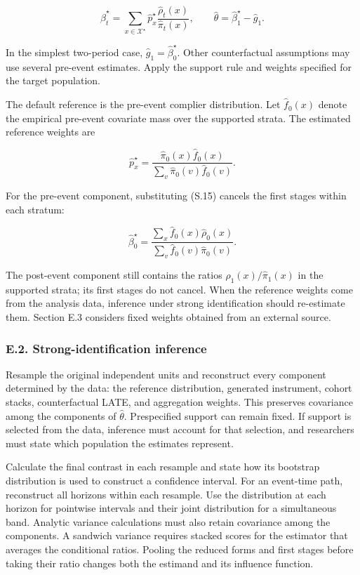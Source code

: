 \documentclass[
  11pt,
]{article}
\begin{document}
\[
\widehat\beta_t^\star
=\sum_{x\in\mathcal X^\star}
\widehat p_x^\star
\frac{\widehat\rho_t(x)}{\widehat\pi_t(x)},
\qquad
\widehat\theta=\widehat\beta_1^\star-\widehat g_1.
\tag{S.14}
\]

In the simplest two-period case, \(\widehat g_1=\widehat\beta_0^\star\).
Other counterfactual assumptions may use several pre-event estimates.
Apply the support rule and weights specified for the target population.

\Needspace{0.14\textheight}

The default reference is the pre-event complier distribution. Let
\(\widehat f_0(x)\) denote the empirical pre-event covariate mass over
the supported strata. The estimated reference weights are

\[
\widehat p_x^\star
=\frac{\widehat\pi_0(x)\widehat f_0(x)}
{\sum_v\widehat\pi_0(v)\widehat f_0(v)}.
\tag{S.15}
\]

For the pre-event component, substituting (S.15) cancels the first
stages within each stratum:

\[
\widehat\beta_0^\star
=\frac{\sum_x\widehat f_0(x)\widehat\rho_0(x)}
{\sum_v\widehat f_0(v)\widehat\pi_0(v)}.
\]

The post-event component still contains the ratios
\(\widehat\rho_1(x)/\widehat\pi_1(x)\) in the supported strata; its
first stages do not cancel. When the reference weights come from the
analysis data, inference under strong identification should re-estimate
them. Section E.3 considers fixed weights obtained from an external
source.

\hypertarget{e.2.-strong-identification-inference}{%
\subsubsection{E.2. Strong-identification
inference}\label{e.2.-strong-identification-inference}}

Resample the original independent units and reconstruct every component
determined by the data: the reference distribution, generated
instrument, cohort stacks, counterfactual LATE, and aggregation weights.
This preserves covariance among the components of \(\widehat\theta\).
Prespecified support can remain fixed. If support is selected from the
data, inference must account for that selection, and researchers must
state which population the estimates represent.

Calculate the final contrast in each resample and state how its
bootstrap distribution is used to construct a confidence interval. For
an event-time path, reconstruct all horizons within each resample. Use
the distribution at each horizon for pointwise intervals and their joint
distribution for a simultaneous band. Analytic variance calculations
must also retain covariance among the components. A sandwich variance
requires stacked scores for the estimator that averages the conditional
ratios. Pooling the reduced forms and first stages before taking their
ratio changes both the estimand and its influence function.
\end{document}

